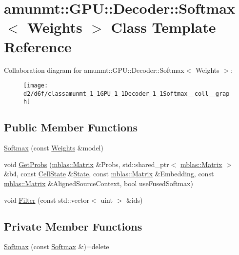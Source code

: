 \hypertarget{classamunmt_1_1GPU_1_1Decoder_1_1Softmax}{}\section{amunmt\+:\+:G\+PU\+:\+:Decoder\+:\+:Softmax$<$ Weights $>$ Class Template Reference}
\label{classamunmt_1_1GPU_1_1Decoder_1_1Softmax}


Collaboration diagram for amunmt\+:\+:G\+PU\+:\+:Decoder\+:\+:Softmax$<$ Weights $>$\+:
\nopagebreak
\begin{figure}[H]
\begin{center}
\leavevmode
\texttt{[image: d2/d6f/classamunmt\_1\_1GPU\_1\_1Decoder\_1\_1Softmax\_\_coll\_\_graph]}
\end{center}
\end{figure}
\subsection*{Public Member Functions}
\begin{DoxyCompactItemize}
\item 
\hyperlink{classamunmt_1_1GPU_1_1Decoder_1_1Softmax_ae08709c146cc9e747fa98acc657433e7}{Softmax} (const \hyperlink{structamunmt_1_1GPU_1_1Weights}{Weights} \&model)
\item 
void \hyperlink{classamunmt_1_1GPU_1_1Decoder_1_1Softmax_ae19befc1a70b3a1762ac0e4dcfb67714}{Get\+Probs} (\hyperlink{namespaceamunmt_1_1GPU_1_1mblas_ab67821a8254de53e45a623cf73c0aef6}{mblas\+::\+Matrix} \&Probs, std\+::shared\+\_\+ptr$<$ \hyperlink{namespaceamunmt_1_1GPU_1_1mblas_ab67821a8254de53e45a623cf73c0aef6}{mblas\+::\+Matrix} $>$ \&b4, const \hyperlink{structamunmt_1_1GPU_1_1CellState}{Cell\+State} \&\hyperlink{classamunmt_1_1State}{State}, const \hyperlink{namespaceamunmt_1_1GPU_1_1mblas_ab67821a8254de53e45a623cf73c0aef6}{mblas\+::\+Matrix} \&Embedding, const \hyperlink{namespaceamunmt_1_1GPU_1_1mblas_ab67821a8254de53e45a623cf73c0aef6}{mblas\+::\+Matrix} \&Aligned\+Source\+Context, bool use\+Fused\+Softmax)
\item 
void \hyperlink{classamunmt_1_1GPU_1_1Decoder_1_1Softmax_a61d7923502de96f87992e54001e523aa}{Filter} (const std\+::vector$<$ uint $>$ \&ids)
\end{DoxyCompactItemize}
\subsection*{Private Member Functions}
\begin{DoxyCompactItemize}
\item 
\hyperlink{classamunmt_1_1GPU_1_1Decoder_1_1Softmax_aa6e256139e9e8f81f50f155b05b63b0c}{Softmax} (const \hyperlink{classamunmt_1_1GPU_1_1Decoder_1_1Softmax}{Softmax} \&)=delete
\end{DoxyCompactItemize}
